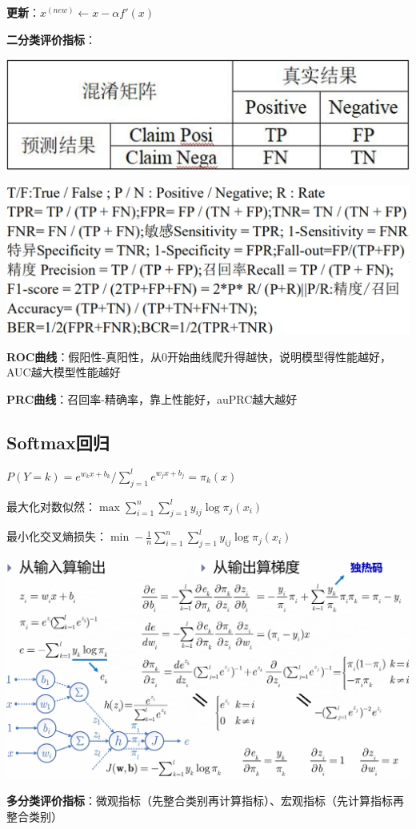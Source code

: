 	\textbf{更新}：$x^{(new)} \leftarrow x-\alpha f'(x)$
	
	\textbf{二分类评价指标}：
	
	\begin{figurehere}
		\centering
		\includegraphics[width=0.6\linewidth]{image01}
		\label{fig:image01}
	\end{figurehere}
	
	\begin{figurehere}
		\centering
		\includegraphics[width=1\linewidth]{image02}
		\label{fig:image02}
	\end{figurehere}
	\textbf{ROC曲线}：假阳性-真阳性，从0开始曲线爬升得越快，说明模型得性能越好，AUC越大模型性能越好
	
	\textbf{PRC曲线}：召回率-精确率，靠上性能好，auPRC越大越好
	
	\subsection*{Softmax回归}
	
	$P(Y=k)=e^{w_{k}x+b_{k}}/\sum_{j=1}^{l}e^{w_{j}x+b_{j}}=\pi_{k}(x)$
	
	最大化对数似然：$\max\sum_{i=1}^{n}\sum_{j=1}^{l}y_{ij}\log\pi_{j}(x_{i})$
	  
	最小化交叉熵损失：$\min-\frac{1}{n}\sum_{i=1}^{n}\sum_{j=1}^{l}y_{ij}\log\pi_{j}(x_{i})$
	
	\begin{figurehere}
		\centering
		\includegraphics[width=1\linewidth]{image03}
		\label{fig:image03}
	\end{figurehere}
	\textbf{多分类评价指标}：微观指标（先整合类别再计算指标）、宏观指标（先计算指标再整合类别）
	
